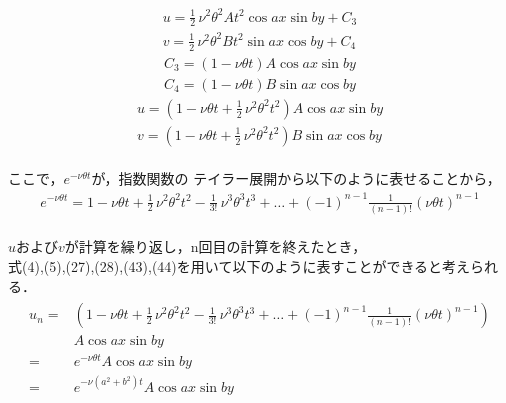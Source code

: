 \documentclass[12pt,a4paper]{jsarticle}
\begin{document}
\begin{eqnarray}
    u=\frac{1}{2}\,\nu^2 \theta^2 A t^2 \cos{ax} \sin{by}+C_3
    \\
    v=
    \frac{1}{2}\,\nu^2 \theta^2 B t^2 \sin{ax} \cos{by}+C_4
\end{eqnarray}
\begin{eqnarray}
    C_3
    =
    \left(
    1-\nu \theta t
    \right)
    A \cos ax \sin by
    \\
    C_4
    =
    \left(
    1-\nu \theta t
    \right)
    B \sin ax \cos by
\end{eqnarray}
\begin{eqnarray}
    u
    =
    \left(
    1-\nu \theta t + \frac{1}{2}\,\nu^2 \theta^2 t^2
    \right)
    A \cos ax \sin by
    \\
    v
    =
    \left(
    1-\nu \theta t + \frac{1}{2}\,\nu^2 \theta^2 t^2
    \right)
    B \sin ax \cos by
\end{eqnarray}\\
\newpage
ここで，$e^{- \nu \theta t}$が，指数関数の
テイラー展開から以下のように表せることから，
\begin{eqnarray}
    e^{- \nu \theta t}
    =
    1
    -
    \nu \theta t
    +
    \frac{1}{2}\,\nu^2 \theta^2 t^2
    -
    \frac{1}{3!}\,\nu^3 \theta^3 t^3
    +
    \dots
    +
    \left(
    -1
    \right)^{n-1}
    \frac{1}{
        \left(
        n-1
        \right)!
    }
    \left(
    \nu \theta t
    \right)^{n-1}
\end{eqnarray}
\\
$u$および$v$が計算を繰り返し，n回目の計算を終えたとき，\\
式(4),(5),(27),(28),(43),(44)を用いて以下のように表すことができると考えられる．
\begin{eqnarray}
    \begin{aligned}
        u_n
        = &
        \left(
        1
        -
        \nu \theta t
        +
        \frac{1}{2}\,\nu^2 \theta^2 t^2
        -
        \frac{1}{3!}\,\nu^3 \theta^3 t^3
        +
        \dots
        +
        \left(
            -1
            \right)^{n-1}
        \frac{1}{
                \left(
                n-1
                \right)!
            }
        \left(
            \nu \theta t
            \right)^{n-1}
        \right)
        \\
          & A \cos ax \sin by
        \\
        = &
        e^{- \nu \theta t} A \cos ax \sin by
        \\
        = &
        e^{- \nu
                \left(
                a^2 + b^2
                \right) t}
        A \cos ax \sin by
    \end{aligned}
\end{eqnarray}
\end{document}
